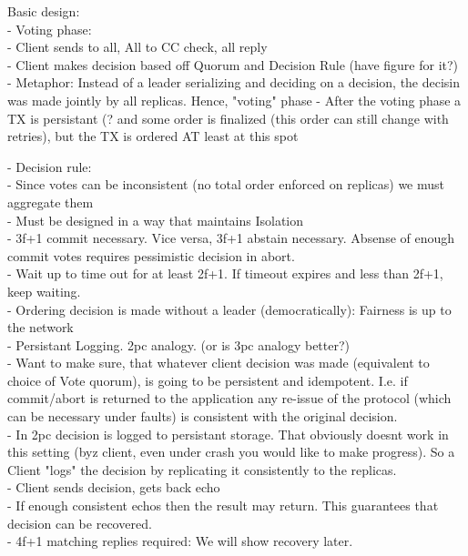 Basic design:\\
- Voting phase:\\
	- Client sends to all, All to CC check, all reply\\
	- Client makes decision based off Quorum and Decision Rule (have figure for it?)\\
	- Metaphor: Instead of a leader serializing and deciding on a decision, the decisin was made jointly by all replicas. Hence, "voting" phase
	- After the voting phase a TX is persistant (?  and some order is finalized (this order can still change with retries), but the TX is ordered AT least at this spot 
	
- Decision rule:\\
	- Since votes can be inconsistent (no total order enforced on replicas) we must aggregate them\\
	- Must be designed in a way that maintains Isolation\\
	- 3f+1 commit necessary. Vice versa, 3f+1 abstain necessary. Absense of enough commit votes requires pessimistic decision in abort.\\
	- Wait up to time out for at least 2f+1. If timeout expires and less than 2f+1, keep waiting. \\
	
- Ordering decision is made without a leader (democratically): Fairness is up to the network\\
	
- Persistant Logging. 2pc analogy. (or is 3pc analogy better?)\\
	- Want to make sure, that whatever client decision was made (equivalent to choice of Vote quorum), is going to be persistent and idempotent. I.e. if commit/abort is returned to the application any re-issue of the protocol (which can be necessary under faults) is consistent with the original decision.\\
	- In 2pc decision is logged to persistant storage. That obviously doesnt work in this setting (byz client, even under crash you would like to make progress). So a Client "logs" the decision by replicating it consistently to the replicas.\\
	- Client sends decision, gets back echo\\
	- If enough consistent echos then the result may return. This guarantees that decision can be recovered.\\
	- 4f+1 matching replies required: We will show recovery later.\\
	
